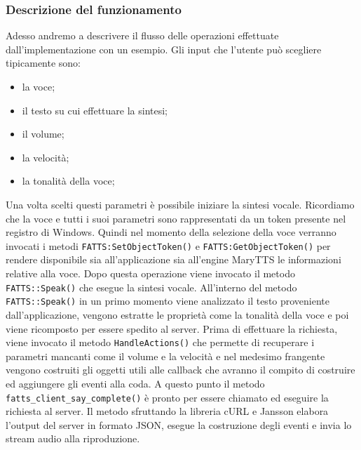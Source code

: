 	\subsubsection{Descrizione del funzionamento}
	Adesso andremo a descrivere il flusso delle operazioni effettuate dall'implementazione con un esempio.
	Gli input che l'utente può scegliere tipicamente sono:
	\begin{itemize}
		\item la voce;
		\item il testo su cui effettuare la sintesi;
		\item il volume;
		\item la velocità;
		\item la tonalità della voce;
	\end{itemize}
	Una volta scelti questi parametri è possibile iniziare la sintesi vocale. Ricordiamo che la voce e tutti i suoi parametri sono rappresentati da un token presente nel registro di Windows.
	Quindi nel momento della selezione della voce verranno invocati i metodi \texttt{FATTS:SetObjectToken()} e \texttt{FATTS:GetObjectToken()} per rendere disponibile sia all'applicazione sia all'engine MaryTTS le informazioni relative alla voce.
	Dopo questa operazione viene invocato il metodo \texttt{FATTS::Speak()} che esegue la sintesi vocale.
	All'interno del metodo \texttt{FATTS::Speak()} in un primo momento viene analizzato il testo proveniente dall'applicazione, vengono estratte le proprietà come la tonalità della voce e poi viene ricomposto per essere spedito al server.
	Prima di effettuare la richiesta, viene invocato il metodo \texttt{HandleActions()} che permette di recuperare i parametri mancanti come il volume e la velocità e nel medesimo frangente vengono costruiti gli oggetti utili alle callback che avranno il compito di costruire ed aggiungere gli eventi alla coda.
	A questo punto il metodo \texttt{fatts\_client\_say\_complete()} è pronto per essere chiamato ed eseguire la richiesta al server.
	Il metodo sfruttando la libreria cURL e Jansson elabora l'output del server in formato JSON, esegue la costruzione degli eventi e invia lo stream audio alla riproduzione. 
	
	
	